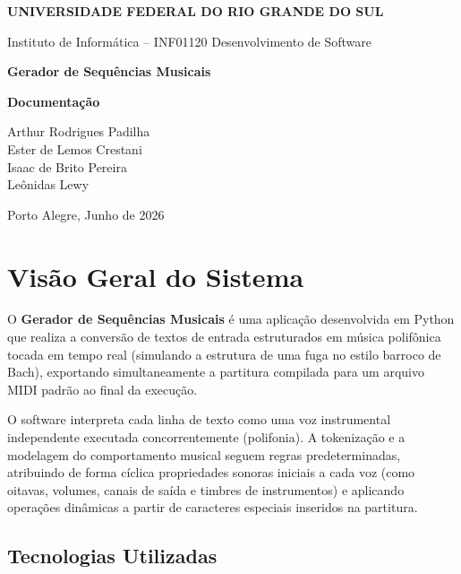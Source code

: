 \documentclass[12pt, a4paper]{article}
\begin{document}
\begin{titlepage}
  \centering
  \vspace*{2cm}
  {\Large\bfseries\color{azulescuro} UNIVERSIDADE FEDERAL DO RIO GRANDE DO SUL\par}
  {\large\color{cinza} Instituto de Informática -- INF01120 Desenvolvimento de Software\par}
  \vspace{1.5cm}
  {\Large\bfseries\color{azulprincipal} Gerador de Sequências Musicais\par}
  \vspace{0.5cm}
  {\large\bfseries Documentação\par}
  \vspace{2.5cm}
  {\large\color{cinza} Arthur Rodrigues Padilha\\ Ester de Lemos Crestani\\ Isaac de Brito Pereira\\ Leônidas Lewy\par}
  \vfill
  {\normalsize Porto Alegre, Junho de 2026}
\end{titlepage}

\tableofcontents
\newpage

\section{Visão Geral do Sistema}

O \textbf{Gerador de Sequências Musicais} é uma aplicação desenvolvida em Python que realiza a conversão de textos de entrada estruturados em música polifônica tocada em tempo real (simulando a estrutura de uma fuga no estilo barroco de Bach), exportando simultaneamente a partitura compilada para um arquivo MIDI padrão ao final da execução.

O software interpreta cada linha de texto como uma voz instrumental independente executada concorrentemente (polifonia). A tokenização e a modelagem do comportamento musical seguem regras predeterminadas, atribuindo de forma cíclica propriedades sonoras iniciais a cada voz (como oitavas, volumes, canais de saída e timbres de instrumentos) e aplicando operações dinâmicas a partir de caracteres especiais inseridos na partitura.

\subsection{Tecnologias Utilizadas}
\end{document}
